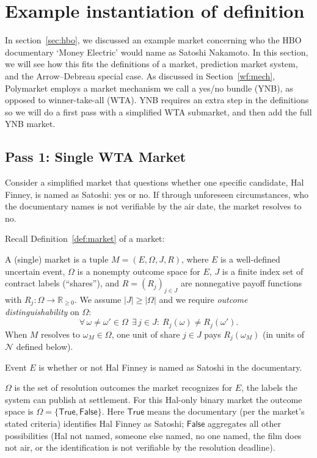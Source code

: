 \section{Example instantiation of definition}
\label{app:example}

In section~\ref{sec:hbo}, we discussed an example market concerning who the HBO documentary `Money Electric' would name as Satoshi Nakamoto. In this section, we will see how this fits the definitions of a market, prediction market system, and the Arrow--Debreau special case. As discussed in Section~\ref{wf:mech}, Polymarket employs a market mechanism we call a yes/no bundle (YNB), as opposed to winner-take-all (WTA). YNB requires an extra step in the definitions so we will do a first pass with a simplified WTA submarket, and then add the full YNB market.

\subsection{Pass 1: Single WTA Market}

Consider a simplified market that questions whether one specific candidate, \eg Hal Finney, is named as Satoshi: yes or no. If through unforeseen circumstances, who the documentary names is not verifiable by the air date, the market resolves to no.

Recall Definition~\ref{def:market} of a market: 

\begin{definition}[Market]
A (single) market is a tuple $M=(E,\Omega,J,R)$, where $E$ is a well-defined uncertain event, $\Omega$ is a nonempty outcome space for $E$, $J$ is a finite index set of contract labels (“shares”), and $R=(R_j)_{j\in J}$ are nonnegative payoff functions with $R_j:\Omega\to\mathbb{R}_{\ge 0}$. 
We assume $|J|\ge|\Omega|$ and we require \emph{outcome distinguishability} on $\Omega$:
\[
\forall\,\omega\neq\omega'\in\Omega\ \ \exists\,j\in J:\ R_j(\omega)\neq R_j(\omega').
\]
When $M$ resolves to $\omega_M\in\Omega$, one unit of share $j\in J$ pays $R_j(\omega_M)$ (in units of $\mathcal{N}$ defined below).
\end{definition}

Event $E$ is whether or not Hal Finney is named as Satoshi in the documentary.

$\Omega$ is the set of resolution outcomes the market recognizes for $E$, the labels the system can publish at settlement. For this Hal-only binary market the outcome space is $\Omega=\{\mathsf{True},\mathsf{False}\}$. Here $\mathsf{True}$ means the documentary (per the market’s stated criteria) identifies Hal Finney as Satoshi; $\mathsf{False}$ aggregates all other possibilities (Hal not named, someone else named, no one named, the film does not air, or the identification is not verifiable by the resolution deadline).

